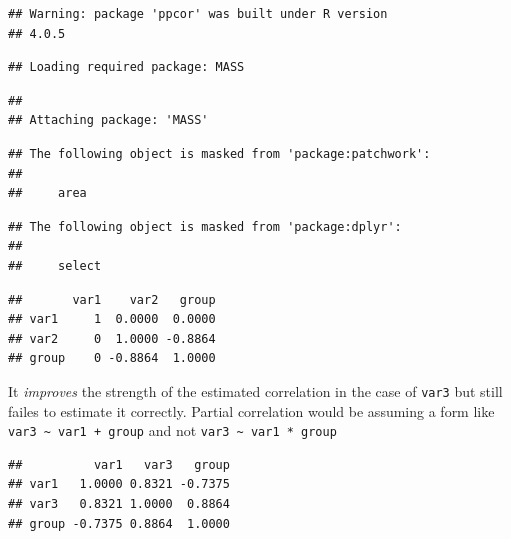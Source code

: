 \documentclass[
]{krantz}
\makeatletter
\newenvironment{Shaded}{\begin{snugshade}}{\end{snugshade}}
\newcommand{\FunctionTok}[1]{\textcolor[rgb]{0,0,0}{#1}}
\newcommand{\NormalTok}[1]{#1}
\newcommand{\SpecialCharTok}[1]{\textcolor[rgb]{0,0,0}{#1}}
\newenvironment{kframe}{%
\medskip{}
\setlength{\fboxsep}{.8em}
 \def\at@end@of@kframe{}%
 \ifinner\ifhmode%
  \def\at@end@of@kframe{\end{minipage}}%
  \begin{minipage}{\columnwidth}%
 \fi\fi%
 \def\FrameCommand##1{\hskip\@totalleftmargin \hskip-\fboxsep
 \colorbox{shadecolor}{##1}\hskip-\fboxsep
     \hskip-\linewidth \hskip-\@totalleftmargin \hskip\columnwidth}%
 \MakeFramed {\advance\hsize-\width
   \@totalleftmargin\z@ \linewidth\hsize
   \@setminipage}}%
 {\par\unskip\endMakeFramed%
 \at@end@of@kframe}
\renewenvironment{Shaded}{\begin{kframe}}{\end{kframe}}
\makeatother
\begin{document}
\begin{verbatim}
## Warning: package 'ppcor' was built under R version
## 4.0.5
\end{verbatim}

\begin{verbatim}
## Loading required package: MASS
\end{verbatim}

\begin{verbatim}
## 
## Attaching package: 'MASS'
\end{verbatim}

\begin{verbatim}
## The following object is masked from 'package:patchwork':
## 
##     area
\end{verbatim}

\begin{verbatim}
## The following object is masked from 'package:dplyr':
## 
##     select
\end{verbatim}

\begin{Shaded}
\end{Shaded}

\begin{verbatim}
##       var1    var2   group
## var1     1  0.0000  0.0000
## var2     0  1.0000 -0.8864
## group    0 -0.8864  1.0000
\end{verbatim}

It \emph{improves} the strength of the estimated correlation in the case of \texttt{var3} but still failes to estimate it correctly.
Partial correlation would be assuming a form like \texttt{var3\ \textasciitilde{}\ var1\ +\ group} and not \texttt{var3\ \textasciitilde{}\ var1\ *\ group}

\begin{Shaded}
\end{Shaded}

\begin{verbatim}
##          var1   var3   group
## var1   1.0000 0.8321 -0.7375
## var3   0.8321 1.0000  0.8864
## group -0.7375 0.8864  1.0000
\end{verbatim}
\end{document}
